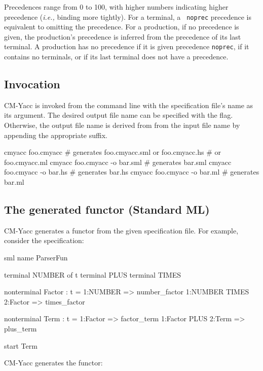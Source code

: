 \documentclass[10pt]{article}
\begin{document}
\begin{strictcode}
\begin{strictcode}
\begin{strictcode}
\begin{strictcode}
\begin{strictcode}
\begin{strictcode}
\begin{strictcode}
Precedences range from 0 to 100, with higher numbers indicating higher
precedence ({\em i.e.,} binding more tightly).  For a terminal, a {\tt
noprec} precedence is equivalent to omitting the precedence.  For a
production, if no precedence is given, the production's precedence is
inferred from the precedence of its last terminal.  A production has no precedence
if it is given precedence {\tt noprec}, if it contains no terminals,
or if its last terminal does not have a precedence.



\subsection{Invocation}

CM-Yacc is invoked from the command line with the specification file's
name as its argument.  The desired output file name can be specified
with the  flag.  Otherwise, the output file name is derived from from
the input file name by appending the appropriate suffix.

\begin{code}
cmyacc foo.cmyacc               # generates foo.cmyacc.sml or foo.cmyacc.hs
                                #   or foo.cmyacc.ml
cmyacc foo.cmyacc -o bar.sml    # generates bar.sml
cmyacc foo.cmyacc -o bar.hs     # generates bar.hs
cmyacc foo.cmyacc -o bar.ml     # generates bar.ml
\end{code}



\subsection{The generated functor (Standard ML)}
\label{sec:yacc-functor-sml}

CM-Yacc generates a functor from the given specification file.  For example,
consider the specification:

\begin{code}
sml
name ParserFun

terminal NUMBER of t
terminal PLUS
terminal TIMES

nonterminal Factor : t =
  1:NUMBER => number_factor
  1:NUMBER TIMES 2:Factor => times_factor

nonterminal Term : t =
  1:Factor => factor_term
  1:Factor PLUS 2:Term => plus_term

start Term
\end{code}

CM-Yacc generates the functor:


\end{strictcode}
\end{strictcode}
\end{strictcode}
\end{strictcode}
\end{strictcode}
\end{strictcode}
\end{strictcode}
\end{document}
